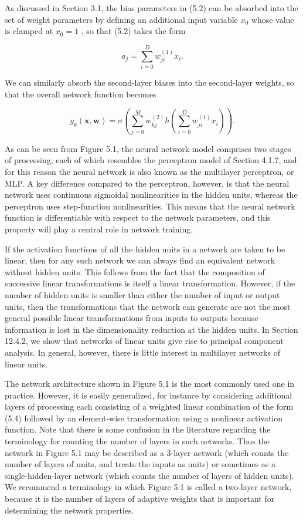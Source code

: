 \documentclass[
  10
]{article}
\begin{document}
As discussed in Section 3.1, the bias parameters in (5.2) can be
absorbed into the set of weight parameters by defining an additional
input variable \(x _ { 0 }\) whose value is clamped at \(x _ { 0 } = 1\)
, so that (5.2) takes the form

\[
a _ {j} = \sum_ {i = 0} ^ {D} w _ {j i} ^ {(1)} x _ {i}.\tag{5.8}
\]

We can similarly absorb the second-layer biases into the second-layer
weights, so that the overall network function becomes

\[
y _ {k} (\mathbf {x}, \mathbf {w}) = \sigma \left(\sum_ {j = 0} ^ {M} w _ {k j} ^ {(2)} h \left(\sum_ {i = 0} ^ {D} w _ {j i} ^ {(1)} x _ {i}\right)\right).\tag{5.9}
\]

As can be seen from Figure 5.1, the neural network model comprises two
stages of processing, each of which resembles the perceptron model of
Section 4.1.7, and for this reason the neural network is also known as
the multilayer perceptron, or MLP. A key difference compared to the
perceptron, however, is that the neural network uses continuous
sigmoidal nonlinearities in the hidden units, whereas the perceptron
uses step-function nonlinearities. This means that the neural network
function is differentiable with respect to the network parameters, and
this property will play a central role in network training.

If the activation functions of all the hidden units in a network are
taken to be linear, then for any such network we can always find an
equivalent network without hidden units. This follows from the fact that
the composition of successive linear transformations is itself a linear
transformation. However, if the number of hidden units is smaller than
either the number of input or output units, then the transformations
that the network can generate are not the most general possible linear
transformations from inputs to outputs because information is lost in
the dimensionality reduction at the hidden units. In Section 12.4.2, we
show that networks of linear units give rise to principal component
analysis. In general, however, there is little interest in multilayer
networks of linear units.

The network architecture shown in Figure 5.1 is the most commonly used
one in practice. However, it is easily generalized, for instance by
considering additional layers of processing each consisting of a
weighted linear combination of the form (5.4) followed by an
element-wise transformation using a nonlinear activation function. Note
that there is some confusion in the literature regarding the terminology
for counting the number of layers in such networks. Thus the network in
Figure 5.1 may be described as a 3-layer network (which counts the
number of layers of units, and treats the inputs as units) or sometimes
as a single-hidden-layer network (which counts the number of layers of
hidden units). We recommend a terminology in which Figure 5.1 is called
a two-layer network, because it is the number of layers of adaptive
weights that is important for determining the network properties.
\end{document}
